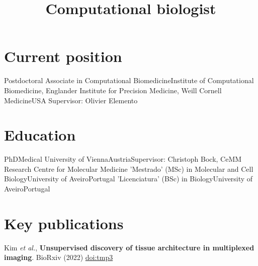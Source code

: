 \documentclass[11pt,a4paper,roman]{moderncv} %
\title{Computational biologist}
\begin{document}
\makecvtitle %


\section{Current position}
    {Postdoctoral Associate in Computational Biomedicine}{Institute of Computational Biomedicine, Englander Institute for Precision Medicine, Weill Cornell Medicine}{USA}
    {}{Supervisor: Olivier Elemento}


\section{Education}
        {PhD}{Medical University of Vienna}{Austria}{}{Supervisor: Christoph Bock, CeMM Research Centre for Molecular Medicine}
        {'Mestrado' (MSc) in Molecular and Cell Biology}{University of Aveiro}{Portugal}{}{}
        {'Licenciatura' (BSc) in Biology}{University of Aveiro}{Portugal}{}{}




\section{Key publications}

    \cvitem{}
        {Kim \textit{et al.}, \textbf{Unsupervised discovery of tissue architecture in multiplexed imaging}. BioRxiv (2022) \href{https://dx.doi.org/tmp3}{doi:tmp3}}
\end{document}
